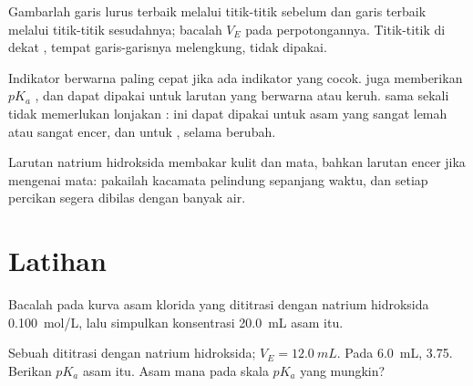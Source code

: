 \begin{method}\label{met:g12:ph-conductivity-titrations:two-lines}
Gambarlah garis lurus terbaik melalui titik-titik sebelum  dan garis terbaik melalui titik-titik sesudahnya; bacalah
$V_E$ pada perpotongannya. Titik-titik di dekat , tempat
garis-garisnya melengkung, tidak dipakai.
\end{method}

\begin{remark}\label{rem:g12:ph-conductivity-titrations:which}
Indikator berwarna paling cepat jika ada indikator yang cocok.  juga memberikan $pK_a$ , dan dapat dipakai untuk
larutan yang berwarna atau keruh.  sama sekali
tidak memerlukan lonjakan :  ini dapat dipakai untuk asam yang
sangat lemah atau sangat encer, dan untuk , selama
 berubah.
\end{remark}

\begin{safety}{}
Larutan natrium hidroksida membakar kulit dan mata, bahkan larutan encer
jika mengenai mata: pakailah kacamata pelindung sepanjang waktu, dan
setiap percikan segera dibilas dengan banyak air.
\end{safety}

\section{Latihan}


\begin{exercise}[$\star$]\label{exo:g12:ph-conductivity-titrations:1}
Bacalah  pada kurva asam klorida yang dititrasi dengan
natrium hidroksida \qty{0.100}{mol/L}, lalu simpulkan konsentrasi
\qty{20.0}{mL} asam itu.
\end{exercise}

\begin{exercise}[$\star$]\label{exo:g12:ph-conductivity-titrations:2}
Sebuah  dititrasi dengan natrium hidroksida;
$V_E = \qty{12.0}{mL}$. Pada \qty{6.0}{mL},  3.75. Berikan
$pK_a$ asam itu. Asam mana pada skala $pK_a$ yang mungkin?
\end{exercise}

